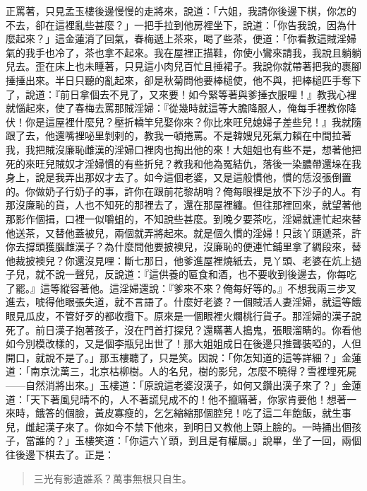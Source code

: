 正罵著，只見孟玉樓後邊慢慢的走將來，說道：「六姐，我請你後邊下棋，你怎的不去，卻在這裡亂些甚麼？」一把手拉到他房裡坐下，說道：「你告我說，因為什麼起來？」這金蓮消了回氣，春梅遞上茶來，喝了些茶，便道：「你看教這賊淫婦氣的我手也冷了，茶也拿不起來。我在屋裡正描鞋，你使小鸞來請我，我說且躺躺兒去。歪在床上也未睡著，只見這小肉兒百忙且捶裙子。我說你就帶著把我的裹腳捶捶出來。半日只聽的亂起來，卻是秋菊問他要棒槌使，他不與，把棒槌匹手奪下了，說道：『前日拿個去不見了，又來要！如今緊等著與爹捶衣服哩！』教我心裡就惱起來，使了春梅去罵那賊淫婦：『從幾時就這等大膽降服人，俺每手裡教你降伏！你是這屋裡什麼兒？壓折轎竿兒娶你來？你比來旺兒媳婦子差些兒！』我就隨跟了去，他還嘴裡咇里剝剌的，教我一頓捲罵。不是韓嫂兒死氣力賴在中間拉著我，我把賊沒廉恥雌漢的淫婦口裡肉也掏出他的來！大姐姐也有些不是，想著他把死的來旺兒賊奴才淫婦慣的有些折兒？教我和他為冤結仇，落後一染膿帶還垛在我身上，說是我弄出那奴才去了。如今這個老婆，又是這般慣他，慣的恁沒張倒置的。你做奶子行奶子的事，許你在跟前花黎胡哨？俺每眼裡是放不下沙子的人。有那沒廉恥的貨，人也不知死的那裡去了，還在那屋裡纏。但往那裡回來，就望著他那影作個揖，口裡一似嚼蛆的，不知說些甚麼。到晚夕要茶吃，淫婦就連忙起來替他送茶，又替他蓋被兒，兩個就弄將起來。就是個久慣的淫婦！只該丫頭遞茶，許你去撐頭獲腦雌漢子？為什麼問他要披襖兒，沒廉恥的便連忙鋪里拿了綢段來，替他裁披襖兒？你還沒見哩：斷七那日，他爹進屋裡燒紙去，見丫頭、老婆在炕上撾子兒，就不說一聲兒，反說道：『這供養的匾食和酒，也不要收到後邊去，你每吃了罷。』這等縱容著他。這淫婦還說：『爹來不來？俺每好等的。』不想我兩三步叉進去，唬得他眼張失道，就不言語了。什麼好老婆？一個賊活人妻淫婦，就這等餓眼見瓜皮，不管好歹的都收攬下。原來是一個眼裡火爛桃行貨子。那淫婦的漢子說死了。前日漢子抱著孩子，沒在門首打探兒？還瞞著人搗鬼，張眼溜睛的。你看他如今別模改樣的，又是個李瓶兒出世了！那大姐姐成日在後邊只推聾裝啞的，人但開口，就說不是了。」那玉樓聽了，只是笑。因說：「你怎知道的這等詳細？」金蓮道：「南京沈萬三，北京枯柳樹。人的名兒，樹的影兒，怎麼不曉得？雪裡埋死屍——自然消將出來。」玉樓道：「原說這老婆沒漢子，如何又鑽出漢子來了？」金蓮道：「天下著風兒晴不的，人不著謊兒成不的！他不攛瞞著，你家肯要他！想著一來時，餓答的個臉，黃皮寡瘦的，乞乞縮縮那個腔兒！吃了這二年飽飯，就生事兒，雌起漢子來了。你如今不禁下他來，到明日又教他上頭上臉的。一時捅出個孩子，當誰的？」玉樓笑道：「你這六丫頭，到且是有權屬。」說畢，坐了一回，兩個往後邊下棋去了。正是：
\begin{quote}
三光有影遺誰系？萬事無根只自生。
\end{quote}

